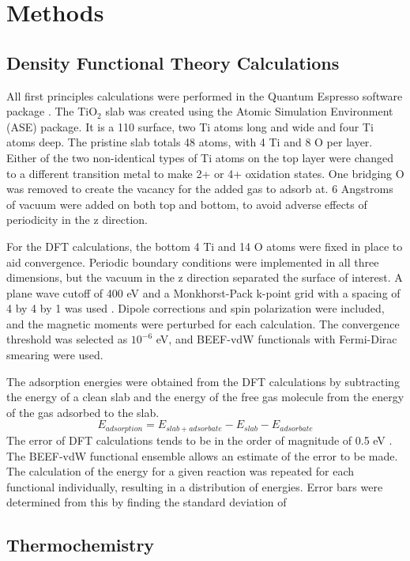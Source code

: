\documentclass[catalysts,article,submit,moreauthors,pdftex,10pt,a4paper]{mdpi}
\theoremstyle{mdpi}
\newcounter{re}
\theoremstyle{mdpidefinition}
\begin{document}
\section{Methods}
\subsection{Density Functional Theory Calculations}
All first principles calculations were performed in the Quantum Espresso software package \cite{QE-2009}.
The TiO$_2$ slab was created using the Atomic Simulation Environment (ASE) package. It is a 110 surface, two Ti atoms long and wide and four Ti atoms deep. The pristine slab totals 48 atoms, with 4 Ti and 8 O per layer. Either of the two non-identical types of Ti atoms on the top layer were changed to a different transition metal to make 2+ or 4+ oxidation states. One bridging O was removed to create the vacancy for the added gas to adsorb at. 6 Angstroms of vacuum were added on both top and bottom, to avoid adverse effects of periodicity in the z direction.

For the DFT calculations, the bottom 4 Ti and 14 O atoms were fixed in place to aid convergence. Periodic boundary conditions were implemented in all three dimensions, but the vacuum in the z direction separated the surface of interest. A plane wave cutoff of 400 eV and a Monkhorst-Pack k-point grid with a spacing of 4 by 4 by 1 was used \cite{Monkhorst_1976}. Dipole corrections and spin polarization were included, and the magnetic moments were perturbed for each calculation. The convergence threshold was selected as $10^{-6}$ eV, and BEEF-vdW functionals \cite{Wellendorff_2012} with Fermi-Dirac smearing were used.

The adsorption energies were obtained from the DFT calculations by subtracting the energy of a clean slab and the energy of the free gas molecule from the energy of the gas adsorbed to the slab.
\begin{equation}
E_{adsorption} = E_{slab+adsorbate} - E_{slab} - E_{adsorbate}
\end{equation}
The error of DFT calculations tends to be in the order of magnitude of 0.5 eV \cite{Gautier_2015}. The BEEF-vdW functional ensemble allows an estimate of the error to be made. The calculation of the energy for a given reaction was repeated for each functional individually, resulting in a distribution of energies. Error bars were determined from this by finding the standard deviation of 

\subsection{Thermochemistry}
\cite{ase-paper,Reuter_2005}
\end{document}
